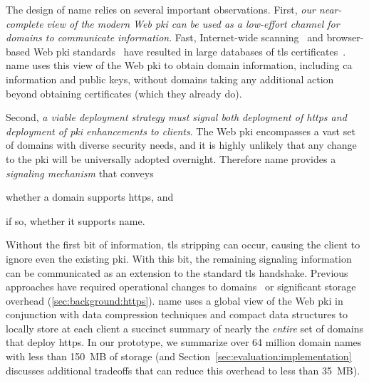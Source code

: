 The design of \ac{name} relies on several important observations. First,
\emph{our near-complete view of the modern Web \ac{pki} can be used as a low-effort channel
for domains to communicate information}. Fast, Internet-wide
scanning~\cite{durumeric2013zmap} and browser-based Web \ac{pki}
standards~\cite{sleevi2016requiring} have resulted in large databases of
\ac{tls} certificates~\cite{durumeric2015search}. 
\ac{name} uses this view of the Web \ac{pki} to obtain domain information, including \ac{ca}
information and public keys, without domains taking any additional action
beyond obtaining certificates (which they already do). 

Second, \emph{a viable deployment strategy must signal both deployment of
\ac{https} and deployment of \ac{pki} enhancements to clients}. The Web \ac{pki}
encompasses a vast set of domains with diverse security needs, and it is highly
unlikely that any change to the \ac{pki} will be universally adopted overnight.
Therefore \ac{name} provides a \emph{signaling mechanism} that conveys
\begin{inparaenum}
\item whether a domain supports \ac{https}, and
\item if so, whether it supports \ac{name}.
\end{inparaenum}
Without the first bit of information, \ac{tls} stripping can occur, causing the
client to ignore even the existing \ac{pki}. With this bit, the remaining
signaling information can be communicated as an extension to the standard
\ac{tls} handshake. Previous approaches have required operational changes to
domains~\cite{rfc4033, rfc6698} or significant storage overhead
(\autoref{sec:background:https}). \ac{name} uses a global view of the Web
\ac{pki} in conjunction with data compression techniques and compact data
structures to locally store at each client a succinct summary of nearly the
\emph{entire} set of domains that deploy \ac{https}. In our prototype, we
summarize over 64 million domain names with less than 150~MB of storage (and
Section~\ref{sec:evaluation:implementation} discusses additional tradeoffs that
can reduce this overhead to less than 35~MB).

